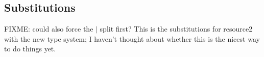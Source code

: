 \documentclass{amsart}
\def\cb{\mid} %
\def\p{^+} %
\def\m{^-}
\def\flip#1{#1^*} %
\newcommand\combine{,}
\begin{document}



\subsection{Substitutions}

FIXME: could also force the $\cb$ split first?  This is the
substitutions for resource2 with the new type system; I haven't thought
about whether this is the nicest way to do things yet.  


\end{document}

